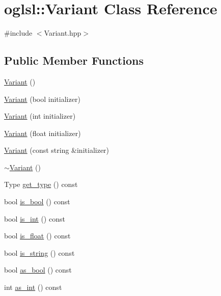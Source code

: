 \hypertarget{classoglsl_1_1_variant}{}\section{oglsl\+:\+:Variant Class Reference}
\label{classoglsl_1_1_variant}


{\ttfamily \#include $<$Variant.\+hpp$>$}

\subsection*{Public Member Functions}
\begin{DoxyCompactItemize}
\item 
\mbox{\hyperlink{classoglsl_1_1_variant_ad39fba162540f53ea88414afd6671c9c}{Variant}} ()
\item 
\mbox{\hyperlink{classoglsl_1_1_variant_a5fd6cda15ba05819bfabb8effc541b7f}{Variant}} (bool initializer)
\item 
\mbox{\hyperlink{classoglsl_1_1_variant_a9365bad4f2caadafd800b644fc216805}{Variant}} (int initializer)
\item 
\mbox{\hyperlink{classoglsl_1_1_variant_adf3a0f59a21cc226832eb3ccf3cb4548}{Variant}} (float initializer)
\item 
\mbox{\hyperlink{classoglsl_1_1_variant_a338c418d9fee06b0947884dd6e45c455}{Variant}} (const string \&initializer)
\item 
\mbox{\hyperlink{classoglsl_1_1_variant_a0a3c4f98ab44e71bf964cb7cfa2c0a7a}{$\sim$\+Variant}} ()
\item 
Type \mbox{\hyperlink{classoglsl_1_1_variant_a612309e9a6e40e0e52e219a5354c082e}{get\+\_\+type}} () const
\item 
bool \mbox{\hyperlink{classoglsl_1_1_variant_af30c5fdbec44d0819f4865b1211a77d8}{is\+\_\+bool}} () const
\item 
bool \mbox{\hyperlink{classoglsl_1_1_variant_a7a6dedce6733e5d283cecf53846ac037}{is\+\_\+int}} () const
\item 
bool \mbox{\hyperlink{classoglsl_1_1_variant_a0af5c23707e3c0688e48bd11c0b3cd7b}{is\+\_\+float}} () const
\item 
bool \mbox{\hyperlink{classoglsl_1_1_variant_a38afd37a6e4b30e139c228f31f8772a8}{is\+\_\+string}} () const
\item 
bool \mbox{\hyperlink{classoglsl_1_1_variant_abeb5c77439ea3f75fc73dbf3247c176d}{as\+\_\+bool}} () const
\item 
int \mbox{\hyperlink{classoglsl_1_1_variant_a90f4f90b61a1e690b0eea7c7b54a515f}{as\+\_\+int}} () const

\end{DoxyCompactItemize}
